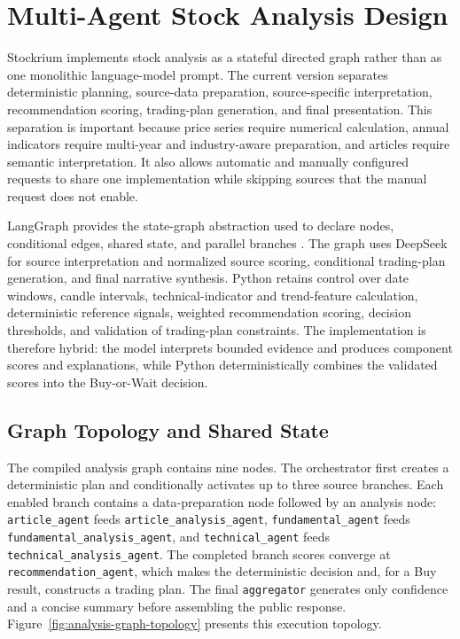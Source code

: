 \section{Multi-Agent Stock Analysis Design}
\label{sec:multi-agent-stock-analysis-design}

Stockrium implements stock analysis as a stateful directed graph rather than as one monolithic language-model prompt. The current version separates deterministic planning, source-data preparation, source-specific interpretation, recommendation scoring, trading-plan generation, and final presentation. This separation is important because price series require numerical calculation, annual indicators require multi-year and industry-aware preparation, and articles require semantic interpretation. It also allows automatic and manually configured requests to share one implementation while skipping sources that the manual request does not enable.

LangGraph provides the state-graph abstraction used to declare nodes, conditional edges, shared state, and parallel branches \cite{langgraph2026graphapi}. The graph uses DeepSeek for source interpretation and normalized source scoring, conditional trading-plan generation, and final narrative synthesis. Python retains control over date windows, candle intervals, technical-indicator and trend-feature calculation, deterministic reference signals, weighted recommendation scoring, decision thresholds, and validation of trading-plan constraints. The implementation is therefore hybrid: the model interprets bounded evidence and produces component scores and explanations, while Python deterministically combines the validated scores into the Buy-or-Wait decision.

\subsection{Graph Topology and Shared State}
\label{subsec:analysis-graph-state}

The compiled analysis graph contains nine nodes. The orchestrator first creates a deterministic plan and conditionally activates up to three source branches. Each enabled branch contains a data-preparation node followed by an analysis node: \texttt{article\_agent} feeds \texttt{article\_analysis\_agent}, \texttt{fundamental\_agent} feeds \texttt{fundamental\_analysis\_agent}, and \texttt{technical\_agent} feeds \texttt{technical\_analysis\_agent}. The completed branch scores converge at \texttt{recommendation\_agent}, which makes the deterministic decision and, for a Buy result, constructs a trading plan. The final \texttt{aggregator} generates only confidence and a concise summary before assembling the public response. Figure~\ref{fig:analysis-graph-topology} presents this execution topology.

